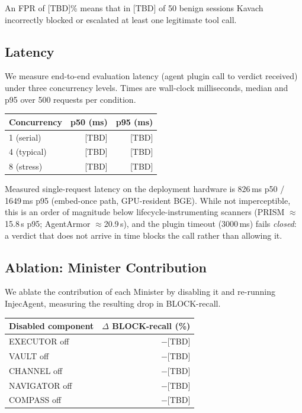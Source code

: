 An FPR of [TBD]\% means that in [TBD] of 50 benign sessions Kavach incorrectly
blocked or escalated at least one legitimate tool call.

\subsection{Latency}

We measure end-to-end evaluation latency (agent plugin call to verdict received)
under three concurrency levels. Times are wall-clock milliseconds, median and
p95 over 500 requests per condition.

\begin{center}
\begin{tabular}{lrr}
\toprule
Concurrency & p50 (ms) & p95 (ms) \\
\midrule
1 (serial)       & [TBD] & [TBD] \\
4 (typical)      & [TBD] & [TBD] \\
8 (stress)       & [TBD] & [TBD] \\
\bottomrule
\end{tabular}
\end{center}

Measured single-request latency on the deployment hardware is
826\,ms p50 / 1649\,ms p95 (embed-once path, GPU-resident BGE). While not
imperceptible, this is an order of magnitude below lifecycle-instrumenting
scanners (PRISM $\approx$15.8\,s p95; AgentArmor $\approx$20.9\,s), and the
plugin timeout (3000\,ms) fails \emph{closed}: a verdict that does not arrive
in time blocks the call rather than allowing it.

\subsection{Ablation: Minister Contribution}

We ablate the contribution of each Minister by disabling it and re-running
InjecAgent, measuring the resulting drop in BLOCK-recall.

\begin{center}
\begin{tabular}{lr}
\toprule
Disabled component & $\Delta$ BLOCK-recall (\%) \\
\midrule
EXECUTOR off  & $-$[TBD] \\
VAULT off     & $-$[TBD] \\
CHANNEL off   & $-$[TBD] \\
NAVIGATOR off & $-$[TBD] \\
COMPASS off   & $-$[TBD] \\
\bottomrule
\end{tabular}
\end{center}

